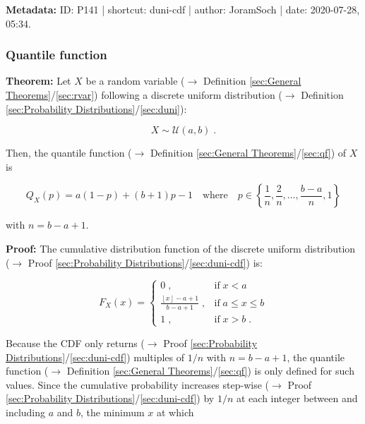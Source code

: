 \documentclass[a4paper,12pt,twoside]{book}
\begin{document}
\vspace{1em}
\textbf{Metadata:} ID: P141 | shortcut: duni-cdf | author: JoramSoch | date: 2020-07-28, 05:34.
\vspace{1em}



\subsubsection[\textbf{Quantile function}]{Quantile function} \label{sec:duni-qf}
\setcounter{equation}{0}

\textbf{Theorem:} Let $X$ be a random variable ($\rightarrow$ Definition \ref{sec:General Theorems}/\ref{sec:rvar}) following a discrete uniform distribution ($\rightarrow$ Definition \ref{sec:Probability Distributions}/\ref{sec:duni}):

\begin{equation} \label{eq:duni-qf-duni}
X \sim \mathcal{U}(a, b) \; .
\end{equation}

Then, the quantile function ($\rightarrow$ Definition \ref{sec:General Theorems}/\ref{sec:qf}) of $X$ is

\begin{equation} \label{eq:duni-qf-duni-qf}
Q_X(p) = a (1-p) + (b+1) p - 1 \quad \text{where} \quad p \in \left\lbrace \frac{1}{n}, \frac{2}{n}, \ldots, \frac{b-a}{n}, 1 \right\rbrace
\end{equation}

with $n = b - a + 1$.


\vspace{1em}
\textbf{Proof:} The cumulative distribution function of the discrete uniform distribution ($\rightarrow$ Proof \ref{sec:Probability Distributions}/\ref{sec:duni-cdf}) is:

\begin{equation} \label{eq:duni-qf-duni-cdf}
F_X(x) = \left\{
\begin{array}{rl}
0 \; , & \text{if} \; x < a \\
\frac{\left\lfloor{x}\right\rfloor - a + 1}{b - a + 1} \; , & \text{if} \; a \leq x \leq b \\
1 \; , & \text{if} \; x > b \; .
\end{array}
\right.
\end{equation}

Because the CDF only returns ($\rightarrow$ Proof \ref{sec:Probability Distributions}/\ref{sec:duni-cdf}) multiples of $1/n$ with $n = b - a + 1$, the quantile function ($\rightarrow$ Definition \ref{sec:General Theorems}/\ref{sec:qf}) is only defined for such values. Since the cumulative probability increases step-wise ($\rightarrow$ Proof \ref{sec:Probability Distributions}/\ref{sec:duni-cdf}) by $1/n$ at each integer between and including $a$ and $b$, the minimum $x$ at which
\end{document}

